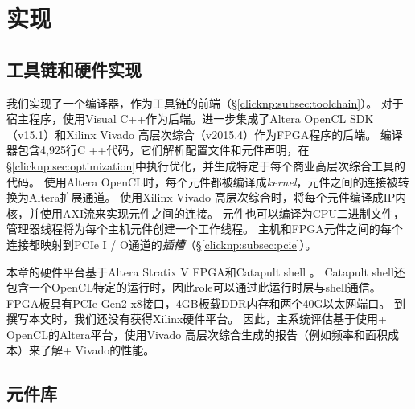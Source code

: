 \section{实现}
\label{clicknp:sec:impl}

\subsection{\name 工具链和硬件实现}

我们实现了一个\name 编译器，作为\name 工具链的前端（\S \ref {clicknp:subsec:toolchain}）。
对于宿主程序，使用Visual C++作为后端。进一步集成了Altera OpenCL SDK（v15.1）\cite {aoc}和Xilinx Vivado 高层次综合（v2015.4）\cite {vivado}作为FPGA程序的后端。
\name 编译器包含4,925行C ++代码，它们解析配置文件和元件声明，在\S \ref {clicknp:sec:optimization}中执行优化，并生成特定于每个商业高层次综合工具的代码。
使用Altera OpenCL时，每个\name 元件都被编译成\textit {kernel}，元件之间的连接被转换为Altera扩展通道。
使用Xilinx Vivado 高层次综合时，将每个元件编译成IP内核，并使用AXI流来实现元件之间的连接。
元件也可以编译为CPU二进制文件，管理器线程将为每个主机元件创建一个工作线程。
主机和FPGA元件之间的每个连接都映射到PCIe I / O通道的\textit {插槽}（\S \ref {clicknp:subsec:pcie}）。

本章的硬件平台基于Altera Stratix V FPGA和Catapult shell \cite {putnam2014reconfigurable}。
Catapult shell还包含一个OpenCL特定的运行时，因此\name role可以通过此运行时层与shell通信。
FPGA板具有PCIe Gen2 x8接口，4GB板载DDR内存和两个40G以太网端口。
到撰写本文时，我们还没有获得Xilinx硬件平台。
因此，主系统评估基于使用\name + OpenCL的Altera平台，使用Vivado 高层次综合生成的报告（例如频率和面积成本）来了解\name + Vivado的性能。

\subsection{\name 元件库}
\label{clicknp:subsec:lib}

